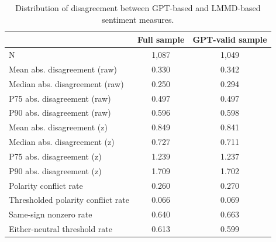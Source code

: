\begin{table}
\caption{Distribution of disagreement between GPT-based and LMMD-based sentiment measures.}
\label{tab:disagreement_summary}
\begin{tabular}{lcc}
\toprule
 & Full sample & GPT-valid sample \\
\midrule
N & 1,087 & 1,049 \\
Mean abs. disagreement (raw) & 0.330 & 0.342 \\
Median abs. disagreement (raw) & 0.250 & 0.294 \\
P75 abs. disagreement (raw) & 0.497 & 0.497 \\
P90 abs. disagreement (raw) & 0.596 & 0.598 \\
Mean abs. disagreement (z) & 0.849 & 0.841 \\
Median abs. disagreement (z) & 0.727 & 0.711 \\
P75 abs. disagreement (z) & 1.239 & 1.237 \\
P90 abs. disagreement (z) & 1.709 & 1.702 \\
Polarity conflict rate & 0.260 & 0.270 \\
Thresholded polarity conflict rate & 0.066 & 0.069 \\
Same-sign nonzero rate & 0.640 & 0.663 \\
Either-neutral threshold rate & 0.613 & 0.599 \\
\bottomrule
\end{tabular}
\end{table}
